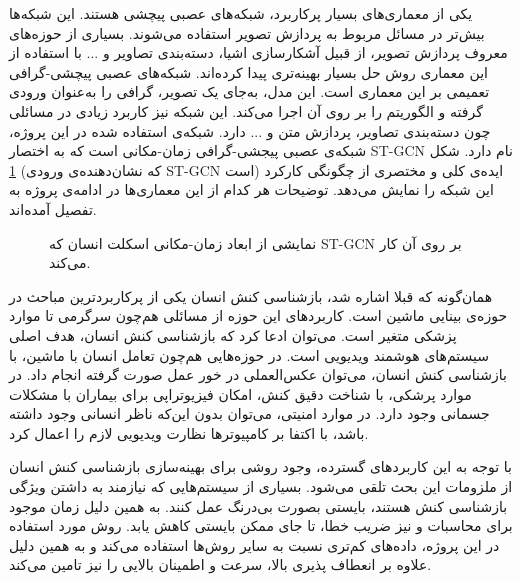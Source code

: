 یکی از معماری‌های بسیار پرکاربرد، شبکه‌های عصبی پیچشی هستند. این شبکه‌ها بیش‌تر در مسائل مربوط به پردازش تصویر استفاده می‌شوند. بسیاری از حوزه‌های معروف پردازش تصویر، از قبیل آشکارسازی اشیا، دسته‌بندی تصاویر و ... با استفاده از این معماری روش حل بسیار بهینه‌تری پیدا کرده‌اند. شبکه‌های عصبی پیچشی-گرافی تعمیمی بر این معماری است. این مدل، به‌جای یک تصویر، گرافی را به‌عنوان ورودی گرفته و الگوریتم را بر روی آن اجرا می‌کند. این شبکه نیز کاربرد زیادی در مسائلی چون دسته‌بندی تصاویر، پردازش متن و ... دارد.\cite{gcn_paper} شبکه‌ی استفاده شده در این پروژه، شبکه‌ی عصبی پیجشی‌-گرافی زمان‌-مکانی است که به اختصار ST-GCN نام دارد. شکل \ref{fig:st-gcn-input} (که نشان‌دهنده‌ی ورودی ST-GCN است) ایده‌ی کلی و مختصری از چگونگی کارکرد این شبکه را نمایش می‌دهد. توضیحات هر کدام از این معماری‌ها در ادامه‌ی پروژه به تفصیل آمده‌اند.



\begin{figure}
\caption[ نمایشی از ابعاد زمان-مکانی اسکلت انسان که ST-GCN بر روی آن کار می‌کند.]{{\footnotesize  نمایشی از ابعاد زمان-مکانی اسکلت انسان که ST-GCN بر روی آن کار می‌کند. \cite{st-gcn}}}
\label{fig:st-gcn-input}
\end{figure}





همان‌گونه که قبلا اشاره شد، بازشناسی کنش انسان یکی از پرکاربردترین مباحث در حوزه‌ی بینایی ماشین است. کاربردهای این حوزه از مسائلی هم‌چون سرگرمی تا موارد پزشکی متغیر است. می‌توان ادعا کرد که بازشناسی کنش انسان، هدف اصلی سیستم‌های هوشمند ویدیویی است.\cite{survey}
در حوزه‌هایی هم‌چون تعامل انسان با ماشین، با بازشناسی کنش انسان، می‌توان عکس‌العملی در خور عمل صورت گرفته انجام داد. در موارد پرشکی، با شناخت دقیق کنش، امکان فیزیوتراپی برای بیماران با مشکلات جسمانی وجود دارد. در موارد امنیتی، می‌توان بدون این‌که ناظر انسانی وجود داشته باشد، با اکتفا بر کامپیوترها نظارت ویدیویی لازم را اعمال کرد.
 
با توجه به این کاربردهای گسترده، وجود روشی برای بهینه‌سازی بازشناسی کنش انسان از ملزومات این بحث تلقی می‌شود. بسیاری از سیستم‌هایی که نیازمند به داشتن ویژگی بازشناسی کنش هستند، بایستی بصورت بی‌درنگ عمل کنند. به همین دلیل زمان موجود برای محاسبات و نیز ضریب خطا، تا جای ممکن بایستی کاهش یابد. روش مورد استفاده در این پروژه، داده‌های کم‌تری نسبت به سایر روش‌ها استفاده می‌کند و به همین دلیل علاوه بر انعطاف پذیری بالا، سرعت و اطمینان بالایی را نیز تامین ‌می‌کند. 


